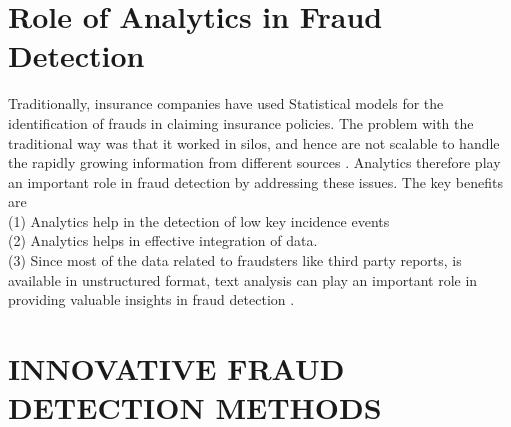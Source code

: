 \documentclass[sigconf]{acmart}
\begin{document}
\section{Role of Analytics in Fraud Detection} 
Traditionally, insurance companies have used Statistical models for the identification of frauds in claiming insurance policies. The problem with the traditional way was that it worked in silos, and hence are not scalable to handle the rapidly growing information from different sources \cite{link7}. Analytics therefore play an important role in fraud detection by addressing these issues. The key benefits are\\
(1) Analytics help in the detection of low key incidence events \\
(2) Analytics helps in effective integration of data.\\
(3) Since most of the data related to fraudsters like third party reports, is available in unstructured format, text analysis can play an important role in providing valuable insights in fraud detection \cite{link7}.

\section{INNOVATIVE FRAUD DETECTION METHODS}
\end{document}
